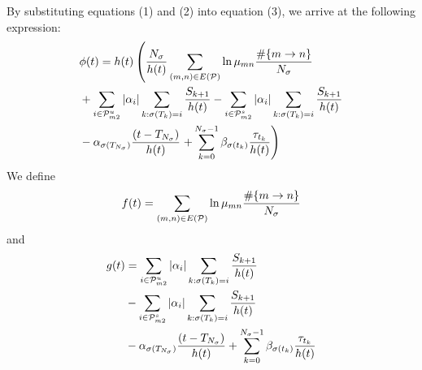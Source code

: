\documentclass[twocolumn]{autart}    %
\begin{document}
\begin{pf}
    
    By substituting equations (1) and (2) into equation (3), we arrive at the following expression: 
    \begin{equation}
        \begin{aligned}
            \setlength{\arraycolsep}{0.9pt}
            &\phi(t)
            = h(t)\left(\frac{N_{\sigma}}{h(t)}\sum_{(m,n) \in E(\mathcal{P})}\ln\mu_{mn}\frac{\# \{m \rightarrow n\}}{N_{\sigma}} \right.\\
            &+ \sum_{i \in \mathcal{P}_{m2}^{u}}\left|\alpha_{i}\right|\sum_{k:\sigma(T_{k})=i}\frac{S_{k+1}}{h(t)}-\sum_{i \in \mathcal{P}_{m2}^{s}}\left|\alpha_{i}\right|\sum_{k:\sigma(T_{k})=i}\frac{S_{k+1}}{h(t)}\\
            &-\alpha_{\sigma(T_{N_{\sigma}})} \frac{(t-T_{N_{\sigma}})}{h(t)}\left.+\sum_{k=0}^{N_{\sigma}-1}\beta_{\sigma(t_{k})}\frac{\tau_{t_{k}}}{h(t)}\right)
        \end{aligned}
    \end{equation}
    We define 
    \begin{equation}
        \begin{aligned}
            \setlength{\arraycolsep}{0.9pt}
            f(t) = \sum_{(m,n) \in E(\mathcal{P})}\ln\mu_{mn}\frac{\# \{m \rightarrow n\}}{N_{\sigma}}
        \end{aligned}
    \end{equation}
    and
    \begin{equation}
        \begin{aligned}
            \setlength{\arraycolsep}{0.9pt}
            g(t) &= \sum_{i \in \mathcal{P}_{m2}^{u}}\left|\alpha_{i}\right|\sum_{k:\sigma(T_{k})=i}\frac{S_{k+1}}{h(t)}\\
            &-\sum_{i \in \mathcal{P}_{m2}^{s}}\left|\alpha_{i}\right|\sum_{k:\sigma(T_{k})=i}\frac{S_{k+1}}{h(t)}\\
            &-\alpha_{\sigma(T_{N_{\sigma}})} \frac{(t-T_{N_{\sigma}})}{h(t)}+\sum_{k=0}^{N_{\sigma}-1}\beta_{\sigma(t_{k})}\frac{\tau_{t_{k}}}{h(t)}
        \end{aligned}
    \end{equation}


\end{pf}
\end{document}
